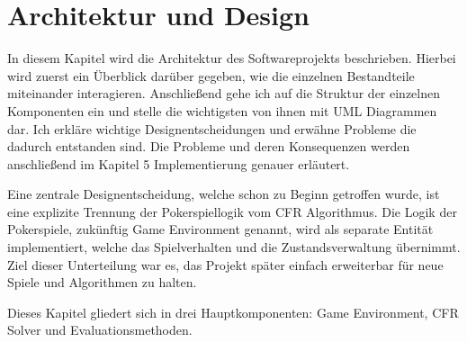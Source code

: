 \chapter{Architektur und Design}
In diesem Kapitel wird die Architektur des Softwareprojekts beschrieben.
Hierbei wird zuerst ein Überblick darüber gegeben, wie die einzelnen Bestandteile miteinander interagieren.
Anschließend gehe ich auf die Struktur der einzelnen Komponenten ein und stelle die wichtigsten von ihnen mit UML Diagrammen dar.
Ich erkläre wichtige Designentscheidungen und erwähne Probleme die dadurch entstanden sind.
Die Probleme und deren Konsequenzen werden anschließend im Kapitel 5 Implementierung genauer erläutert.

Eine zentrale Designentscheidung, welche schon zu Beginn getroffen wurde, ist eine explizite Trennung der Pokerspiellogik vom CFR Algorithmus.
Die Logik der Pokerspiele, zukünftig Game Environment genannt, wird als separate Entität implementiert, welche das Spielverhalten und die Zustandsverwaltung übernimmt.
Ziel dieser Unterteilung war es, das Projekt später einfach erweiterbar für neue Spiele und Algorithmen zu halten.

Dieses Kapitel gliedert sich in drei Hauptkomponenten: Game Environment, CFR Solver und Evaluationsmethoden.
\newpage




